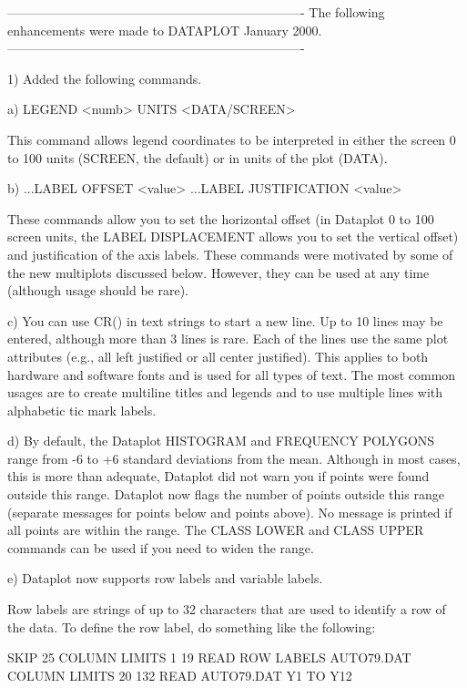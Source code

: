 {----------------------------------------------------------------------
The following enhancements were made to DATAPLOT January         2000.
----------------------------------------------------------------------

 1) Added the following commands.

    a) LEGEND <numb> UNITS <DATA/SCREEN>

       This command allows legend coordinates to be interpreted
       in either the screen 0 to 100 units (SCREEN, the default) or in
       units of the plot (DATA).

    b) ...LABEL OFFSET <value>
       ...LABEL JUSTIFICATION <value>

       These commands allow you to set the horizontal offset
       (in Dataplot 0 to 100 screen units, the LABEL DISPLACEMENT
       allows you to set the vertical offset) and justification of
       the axis labels.  These commands were motivated by some
       of the new multiplots discussed below.  However, they
       can be used at any time (although usage should be rare).

    c) You can use CR() in text strings to start a new line.
       Up to 10 lines may be entered, although more than 3 lines
       is rare.  Each of the lines use the same plot attributes
       (e.g., all left justified or all center justified).
       This applies to both hardware and software fonts and
       is used for all types of text.  The most common usages
       are to create multiline titles and legends and to use
       multiple lines with alphabetic tic mark labels.

    d) By default, the Dataplot HISTOGRAM and FREQUENCY POLYGONS
       range from -6 to +6 standard deviations from the mean.
       Although in most cases, this is more than adequate,
       Dataplot did not warn you if points were found outside
       this range.  Dataplot now flags the number of points
       outside this range (separate messages for points below
       and points above).  No message is printed if all points
       are within the range.  The CLASS LOWER and CLASS UPPER
       commands can be used if you need to widen the range.

    e) Dataplot now supports row labels and variable labels.

       Row labels are strings of up to 32 characters that
       are used to identify a row of the data.  To define
       the row label, do something like the following:

          SKIP 25
          COLUMN LIMITS 1 19
          READ ROW LABELS AUTO79.DAT
          COLUMN LIMITS 20 132
          READ AUTO79.DAT Y1 TO Y12

}
